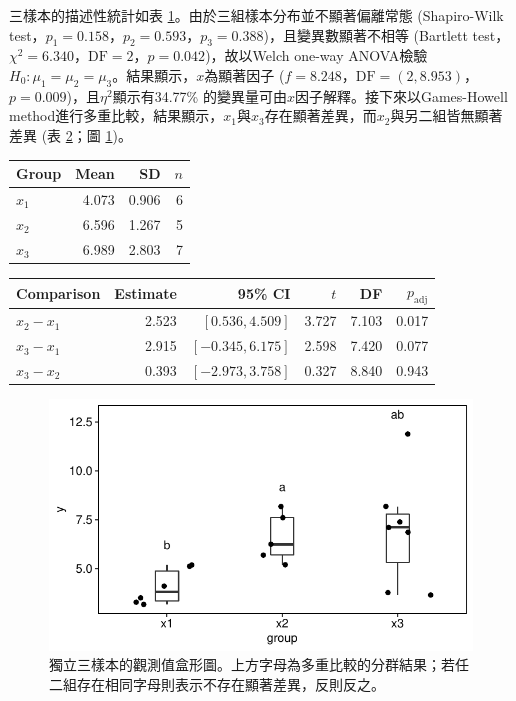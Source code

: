 \documentclass[12pt]{article}
\begin{document}
三樣本的描述性統計如表 \ref{table:Welch_ANOVA}。由於三組樣本分布並不顯著偏離常態 (Shapiro-Wilk test，$p_1 = 0.158$，$p_2 = 0.593$，$p_3 = 0.388$)，且變異數顯著不相等 (Bartlett test，$\chi^2 = 6.340$，$\text{DF} = 2$，$p = 0.042$)，故以Welch one-way ANOVA檢驗$H_0:\mu_1 = \mu_2 = \mu_3$。結果顯示，$x$為顯著因子 ($f = 8.248$，$\text{DF} = (2, 8.953)$，$p = 0.009$)，且$\eta^2$顯示有34.77\% 的變異量可由$x$因子解釋。接下來以Games-Howell method進行多重比較，結果顯示，$x_1$與$x_3$存在顯著差異，而$x_2$與另二組皆無顯著差異 (表 \ref{table:Welch_ANOVA_post}；圖 \ref{fig:Welch_ANOVA})。

\begin{table}[htb!]
	\centering
	\begin{tabular}{lrrr}
		\hline
		Group & Mean & SD & $n$ \\ 
		\hline
		$x_1$ & 4.073 & 0.906 &    6 \\ 
		$x_2$ & 6.596 & 1.267 &    5 \\ 
		$x_3$ & 6.989 & 2.803 &    7 \\ 
		\hline
	\end{tabular}
	\label{table:Welch_ANOVA}
\end{table}

\begin{table}[htb!]
	\centering
	\begin{tabular}{lrrrrr}
		\hline
		Comparison & Estimate & 95\% CI & $t$ & DF & $p_{\mathrm{adj}}$ \\ 
		\hline
		$x_2-x_1$ & 2.523 & $\left[0.536 , 4.509\right]$ & 3.727 & 7.103 & 0.017 \\ 
		$x_3-x_1$ & 2.915 & $\left[-0.345 , 6.175\right]$ & 2.598 & 7.420 & 0.077 \\ 
		$x_3-x_2$ & 0.393 & $\left[-2.973 , 3.758\right]$ & 0.327 & 8.840 & 0.943 \\ 
		\hline
	\end{tabular}
	\label{table:Welch_ANOVA_post}
\end{table}

\begin{figure}[htb!]
	\centering
	\includegraphics[]{Welch_ANOVA.pdf}
	\caption{獨立三樣本的觀測值盒形圖。上方字母為多重比較的分群結果；若任二組存在相同字母則表示不存在顯著差異，反則反之。}
	\label{fig:Welch_ANOVA}
\end{figure}
\end{document}
